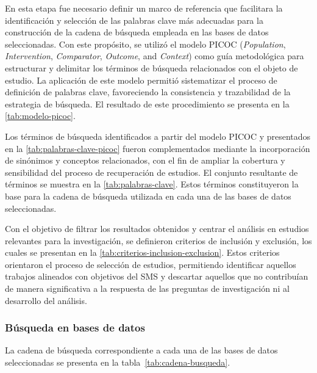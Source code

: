 En esta etapa fue necesario definir un marco de referencia que facilitara la identificación y selección de las palabras clave más adecuadas para la construcción de la cadena de búsqueda empleada en las bases de datos seleccionadas. Con este propósito, se utilizó el modelo PICOC (\textit{Population}, \textit{Intervention}, \textit{Comparator}, \textit{Outcome}, and \textit{Context}) como guía metodológica para estructurar y delimitar los términos de búsqueda relacionados con el objeto de estudio. La aplicación de este modelo permitió sistematizar el proceso de definición de palabras clave, favoreciendo la consistencia y trazabilidad de la estrategia de búsqueda. El resultado de este procedimiento se presenta en la \autoref{tab:modelo-picoc}.




Los términos de búsqueda identificados a partir del modelo PICOC y presentados en la \autoref{tab:palabras-clave-picoc} fueron complementados mediante la incorporación de sinónimos y conceptos relacionados, con el fin de ampliar la cobertura y sensibilidad del proceso de recuperación de estudios. El conjunto resultante de términos se muestra en la \autoref{tab:palabras-clave}. Estos términos constituyeron la base para la cadena de búsqueda utilizada en cada una de las bases de datos seleccionadas.



Con el objetivo de filtrar los resultados obtenidos y centrar el análisis en estudios relevantes para la investigación, se definieron criterios de inclusión y exclusión, los cuales se presentan en la \autoref{tab:criterios-inclusion-exclusion}. Estos criterios orientaron el proceso de selección de estudios, permitiendo identificar aquellos trabajos alineados con objetivos del \ac{SMS} y descartar aquellos que no contribuían de manera significativa a la respuesta de las preguntas de investigación ni al desarrollo del análisis.




\subsubsection{Búsqueda en bases de datos}\label{par:busqueda-bases-datos}

La cadena de búsqueda correspondiente a cada una de las bases de datos seleccionadas se presenta en la tabla~\ref{tab:cadena-busqueda}.

